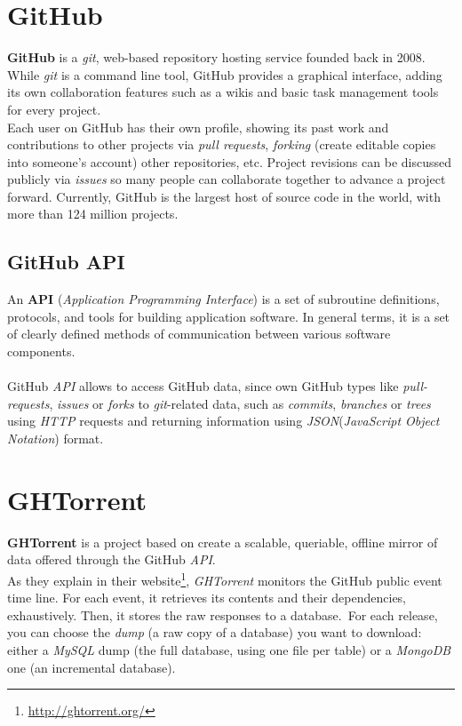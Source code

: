 \documentclass[a4paper, 12pt]{book}
\begin{document}
\section{GitHub}
\label{sec:github}
\textbf{GitHub} is a \emph{git}, web-based repository hosting service founded back in 2008. While \emph{git} is a command
line tool, GitHub provides a graphical interface, adding its own collaboration features such as a wikis and basic task
management tools for every project.\\
Each user on GitHub has their own profile, showing its past work and contributions to
other projects via \textit{pull requests}, \textit{forking} (create editable copies into someone's account) other repositories, etc.
Project revisions can be discussed publicly via \textit{issues} so many people can collaborate together to advance a project
forward. Currently, GitHub is the largest host of source code in the world,
with more than 124 million projects.
\subsection{GitHub API}
\label{ssec:sec_gh-api}
An \textbf{API} (\textit{Application Programming Interface}) is a set of subroutine definitions, protocols, and tools for building
application software. In general terms, it is a set of clearly defined methods of communication between various software components.\\\\
GitHub \textit{API} allows to access GitHub data, since own GitHub types like \textit{pull-requests}, \textit{issues} or \textit{forks}
to \emph{git}-related data, such as \textit{commits}, \textit{branches} or \textit{trees} using \textit{HTTP} requests and
returning information using \emph{JSON}(\textit{JavaScript Object Notation}) format.
\section{GHTorrent}
\label{sec:ghtorrent}
\textbf{GHTorrent} is a project based on create a scalable, queriable, offline mirror of data offered through the GitHub \textit{API}.\\
As they explain in their website\footnote{\url{http://ghtorrent.org/}}, \emph{GHTorrent} monitors the GitHub public event time line.
For each event, it retrieves its contents and their dependencies, exhaustively. Then, it stores the raw responses to a database.\
For each release, you can choose the \textit{dump} (a raw copy of a database) you want to download: either a \emph{MySQL} dump
(the full database, using one file per table) or a \emph{MongoDB} one (an incremental database).\\
\end{document}
